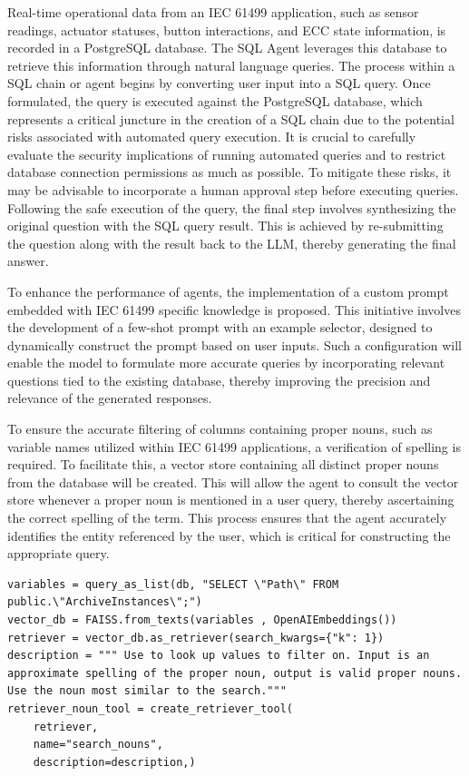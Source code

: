 \documentclass[conference]{IEEEtran}
\begin{document}
Real-time operational data from an IEC 61499 application, such as sensor readings, actuator statuses, button interactions, and ECC state information, is recorded in a PostgreSQL database. The SQL Agent leverages this database to retrieve this information through natural language queries. The process within a SQL chain or agent begins by converting user input into a SQL query. Once formulated, the query is executed against the PostgreSQL database, which represents a critical juncture in the creation of a SQL chain due to the potential risks associated with automated query execution. It is crucial to carefully evaluate the security implications of running automated queries and to restrict database connection permissions as much as possible. To mitigate these risks, it may be advisable to incorporate a human approval step before executing queries. Following the safe execution of the query, the final step involves synthesizing the original question with the SQL query result. This is achieved by re-submitting the question along with the result back to the LLM, thereby generating the final answer.

To enhance the performance of agents, the implementation of a custom prompt embedded with IEC 61499 specific knowledge is proposed. This initiative involves the development of a few-shot prompt with an example selector, designed to dynamically construct the prompt based on user inputs. Such a configuration will enable the model to formulate more accurate queries by incorporating relevant questions tied to the existing database, thereby improving the precision and relevance of the generated responses.

To ensure the accurate filtering of columns containing proper nouns, such as variable names utilized within IEC 61499 applications, a  verification of spelling is required. To facilitate this, a vector store containing all distinct proper nouns from the database will be created. This will allow the agent to consult the vector store whenever a proper noun is mentioned in a user query, thereby ascertaining the correct spelling of the term. This process ensures that the agent accurately identifies the entity referenced by the user, which is critical for constructing the appropriate query.

\begin{lstlisting} 
variables = query_as_list(db, "SELECT \"Path\" FROM public.\"ArchiveInstances\";")
vector_db = FAISS.from_texts(variables , OpenAIEmbeddings())
retriever = vector_db.as_retriever(search_kwargs={"k": 1})
description = """ Use to look up values to filter on. Input is an approximate spelling of the proper noun, output is valid proper nouns. Use the noun most similar to the search."""
retriever_noun_tool = create_retriever_tool(
    retriever,
    name="search_nouns",
    description=description,)
\end{lstlisting}
\end{document}
